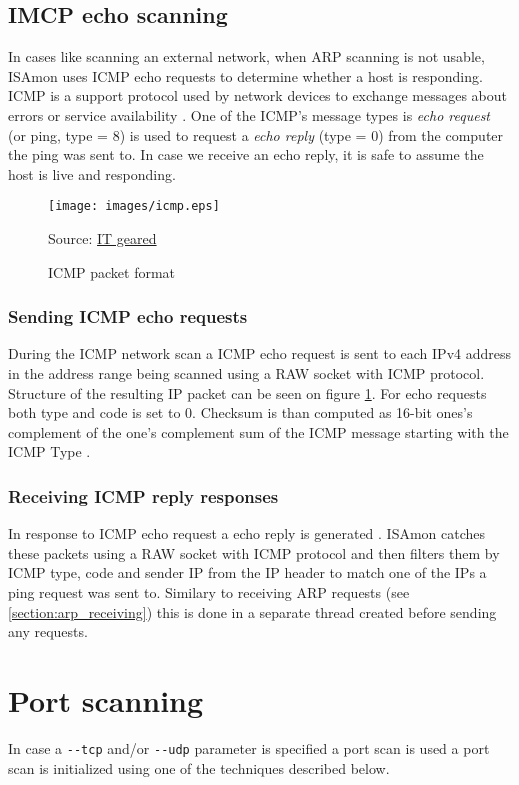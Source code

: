 \documentclass[11pt,a4paper]{article}
\newcommand{\source}[1]{\caption*{Source: {#1}} }
\begin{document}
	\subsection{IMCP echo scanning}
		In cases like scanning an external network, when ARP scanning is not usable, ISAmon uses ICMP echo requests to determine whether a host is responding. ICMP is a support protocol used by network devices to exchange messages about errors or service availability \cite{wiki:icmp}. One of the ICMP's message types is \emph{echo request} (or ping, type = 8) is used to request a \emph{echo reply} (type = 0) from the computer the ping was sent to. In case we receive an echo reply, it is safe to assume the host is live and responding.


		\begin{figure}[h]
			\centering
			\texttt{[image: images/icmp.eps]}
			\caption{ICMP packet format}
			\label{fig:icmp}
			\source{\href{http://www.itgeared.com/articles/1094-ping-and-icmp-error-messages/}{IT geared}}
		\end{figure}

		\subsubsection*{Sending ICMP echo requests}
			During the ICMP network scan a ICMP echo request is sent to each IPv4 address in the address range being scanned using a RAW socket with ICMP protocol. Structure of the resulting IP packet can be seen on figure \ref{fig:icmp}. For echo requests both type and code is set to 0. Checksum is than computed as 16-bit ones's complement of the one's complement sum of the ICMP message starting with the ICMP Type \cite{RFC0792}.

		\subsubsection*{Receiving ICMP reply responses}
			In response to ICMP echo request a echo reply is generated \cite{wiki:ping}. ISAmon catches these packets using a RAW socket with ICMP protocol and then filters them by ICMP type, code and sender IP from the IP header to match one of the IPs a ping request was sent to. Similary to receiving ARP requests (see \ref{section:arp_receiving}) this is done in a separate thread created before sending any requests.

\section{Port scanning}
	In case a \texttt{-{}-tcp} and/or \texttt{-{}-udp} parameter is specified a port scan is used a port scan is initialized using one of the techniques described below.
\end{document}
